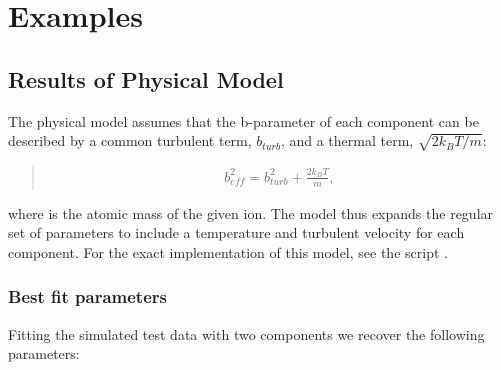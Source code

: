 \documentclass[letterpaper,10pt,english]{sphinxmanual}
\begin{document}
\chapter{Examples}
\label{\detokenize{index:examples}}

\section{Results of Physical Model}
\label{\detokenize{physical_model_results:results-of-physical-model}}\label{\detokenize{physical_model_results::doc}}
The physical model assumes that the b-parameter of each component
can be described by a common turbulent term, \(b_{turb}\), and
a thermal term, \(\sqrt{2 k_B T / m}\):
\begin{quote}
\begin{equation*}
\begin{split}b_{eff}^2 = b_{turb}^2 + \frac{2 k_B T}{m} ,\end{split}
\end{equation*}\end{quote}

where  is the atomic mass of the given ion.
The model thus expands the regular set of parameters to include
a temperature and turbulent velocity for each component.
For the exact implementation of this model, see the script
.


\subsection{Best fit parameters}
\label{\detokenize{physical_model_results:best-fit-parameters}}
Fitting the simulated test data with two components we recover
the following parameters:
\end{document}
